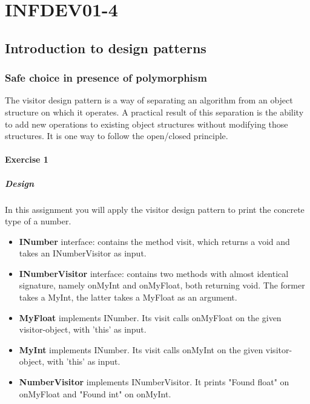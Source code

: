 \setcounter{part}{4}
\part{INFDEV01-4}
\setcounter{chapter}{0}
\chapter{Introduction to design patterns}

\section{Safe choice in presence of polymorphism }
The visitor design pattern is a way of separating an algorithm from an object structure on which it operates.
A practical result of this separation is the ability to add new operations to existing object structures without modifying those structures.
It is one way to follow the open/closed principle.

    
\subsection{Exercise 1}
\subsubsection{Design}
In this assignment you will apply the visitor design pattern to print the concrete type of a number.

\begin{itemize}
\item \textbf{INumber} interface: contains the method visit, which returns a void and takes an INumberVisitor as input.
\item \textbf{INumberVisitor} interface: contains two methods with almost identical signature, namely onMyInt and onMyFloat, both returning void. The former takes a MyInt, the latter takes a MyFloat as an argument.
\item \textbf{MyFloat} implements INumber. Its visit calls onMyFloat on the given visitor-object, with 'this' as input.
\item \textbf{MyInt} implements INumber. Its visit calls onMyInt on the given visitor-object, with 'this' as input.
\item \textbf{NumberVisitor} implements INumberVisitor. It prints "Found float" on onMyFloat and "Found int" on onMyInt.
\end{itemize}
